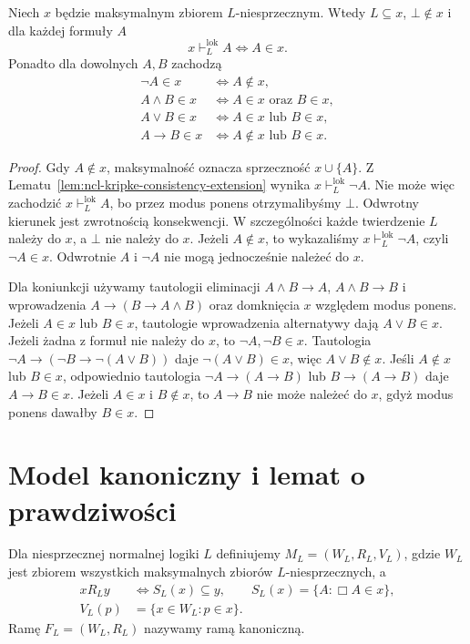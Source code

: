 \begin{stwierdzenie}
\label{prop:ncl-kripke-maximal-consistent-laws}
Niech $x$ będzie maksymalnym zbiorem
$L$-niesprzecznym. Wtedy $L\subseteq x$,
$\bot\notin x$ i dla każdej formuły $A$
\[
 x\vdash_L^{\mathrm{lok}}A\iff A\in x.
\]
Ponadto dla dowolnych $A,B$ zachodzą
\[
\begin{aligned}
 \neg A\in x &\iff A\notin x,\\
 A\wedge B\in x &\iff A\in x\text{ oraz }B\in x,\\
 A\vee B\in x &\iff A\in x\text{ lub }B\in x,\\
 A\to B\in x &\iff A\notin x\text{ lub }B\in x.
\end{aligned}
\]
\end{stwierdzenie}
\begin{proof}
Gdy $A\notin x$, maksymalność oznacza
sprzeczność $x\cup\{A\}$. Z
Lematu~\ref{lem:ncl-kripke-consistency-extension}
wynika $x\vdash_L^{\mathrm{lok}}\neg A$.
Nie może więc zachodzić
$x\vdash_L^{\mathrm{lok}}A$, bo przez modus
ponens otrzymalibyśmy $\bot$.
Odwrotny kierunek jest zwrotnością konsekwencji.
W szczególności każde twierdzenie $L$ należy
do $x$, a $\bot$ nie należy do $x$.
Jeżeli $A\notin x$, to wykazaliśmy
$x\vdash_L^{\mathrm{lok}}\neg A$, czyli
$\neg A\in x$. Odwrotnie $A$ i $\neg A$
nie mogą jednocześnie należeć do $x$.

Dla koniunkcji używamy tautologii eliminacji
$A\wedge B\to A$, $A\wedge B\to B$
i wprowadzenia $A\to(B\to A\wedge B)$
oraz domknięcia $x$ względem modus ponens.
Jeżeli $A\in x$ lub $B\in x$, tautologie
wprowadzenia alternatywy dają $A\vee B\in x$.
Jeżeli żadna z formuł nie należy do $x$,
to $\neg A,\neg B\in x$. Tautologia
$\neg A\to(\neg B\to\neg(A\vee B))$
daje $\neg(A\vee B)\in x$, więc
$A\vee B\notin x$.
Jeśli $A\notin x$ lub $B\in x$, odpowiednio
tautologia $\neg A\to(A\to B)$ lub
$B\to(A\to B)$ daje $A\to B\in x$.
Jeżeli $A\in x$ i $B\notin x$, to
$A\to B$ nie może należeć do $x$,
gdyż modus ponens dawałby $B\in x$.
\end{proof}

\section{Model kanoniczny i lemat o prawdziwości}

\begin{definicja}
\label{def:ncl-kripke-canonical-model}
Dla niesprzecznej normalnej logiki $L$
definiujemy $M_L=(W_L,R_L,V_L)$, gdzie
$W_L$ jest zbiorem wszystkich maksymalnych
zbiorów $L$-niesprzecznych, a
\[
\begin{aligned}
 xR_Ly &\iff S_L(x)\subseteq y,\qquad
 S_L(x)=\{A:\Box A\in x\},\\
 V_L(p)&=\{x\in W_L:p\in x\}.
\end{aligned}
\]
Ramę $F_L=(W_L,R_L)$ nazywamy ramą kanoniczną.
\end{definicja}

